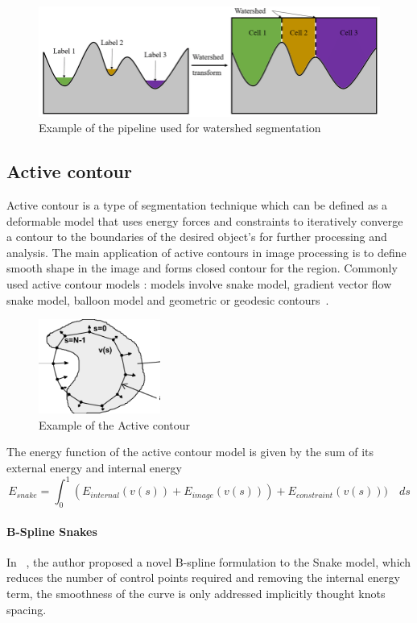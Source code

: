 \documentclass[main.tex]{subfiles}
\begin{document}
\begin{figure}[H]
    \centering
    \includegraphics[width=12cm]{images/watershed.png}
    \caption{Example of the pipeline used for watershed segmentation}
    \label{fig:watershed}
\end{figure}
\subsection{Active contour}

Active contour is a type of segmentation technique which can be defined as a deformable model that uses energy forces and constraints to iteratively converge a contour to the boundaries of the desired object's for further processing and analysis. The main application of active contours in image processing is to define smooth shape in the image and forms closed contour for the region. Commonly used active contour models : models involve snake model, gradient vector flow snake model, balloon model and geometric or geodesic contours~\cite{Bengtsson2004}.

\begin{figure}[H]
    \centering
    \includegraphics[width=4cm]{images/ac.png}
    \caption{Example of the Active contour}
    \label{fig:ac}
\end{figure}

The energy function of the active contour model is given by the sum of its external energy and internal energy
\begin{equation}
    E_{\mathit{snake}} = \int_{0}^{1} (E_{\mathit{internal}}(v(s)) + E_{\mathit{image}}(v(s))) + E_{\mathit{constraint}}(v(s)))\quad ds
\end{equation}
\paragraph{B-Spline Snakes} In ~\cite{Brigger2000}, the author proposed a novel B-spline formulation to the Snake model, which reduces the number of control points required and removing the internal energy term, the smoothness of the curve is only addressed implicitly thought knots spacing.
\end{document}
